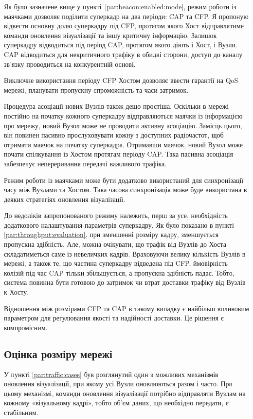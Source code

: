 \documentclass[a4paper,ukrainian,utf8,nocolumnsxix,floatsection,equationsection]{eskdtext}
\begin{document}
Як було зазначене вище у пункті~\ref{par:beacon:enabled:mode}, режим роботи із маячками дозволяє поділити суперкадр на два періоди: CAP та CFP. Я пропоную відвести основну долю суперкадру під CFP, протягом якого Хост відправлятиме команди оновлення візуалізації та іншу критичну інформацію. Залишок суперкадру відводиться під період CAP, протягом якого діють і Хост, і Вузли. CAP відводиться для некритичного трафіку в обидві сторони, доступ до каналу зв’язку проводиться на конкурентній основі. 

Виключне використання періоду CFP Хостом дозволяє ввести гарантії на QoS мережі, планувати пропускну спроможність та часи затримок. 

Процедура асоціації нових Вузлів також дещо простіша. Оскільки в мережі постійно на початку кожного суперкадру відправляються маячки із інформацією про мережу, новий Вузол може не проводити активну асоціацію. Замісць цього, він повинен пасивно прослуховувати кожну з доступних радіочастот, щоб отримати маячок на початку суперкадра. Отримавши маячок, новий Вузол може почати спілкування із Хостом протягам періоду CAP. Така пасивна асоціація забезпечує непереривання передачі важливого трафіка.

Режим роботи із маячками може бути додатково використаний для синхронізації часу між Вузлами та Хостом. Така часова синхронізація може буде використана в деяких стратегіях оновлення візуалізації.

До недоліків запропонованого режиму належить, перш за усе, необхідність додаткового налаштування параметрів суперкадру. Як було показано в пункті \ref{par:throughput:evaluation}, при зменшенні розміру кадру, зменшується пропускна здібність. Але, можна очікувати, що трафік від Вузлів до Хоста складатиметься саме із невеличких кадрів. Враховуючи велику кількість Вузлів в мережі, а також те, що частина суперкадру відведена під CFP, ймовірність колізій під час CAP тільки збільшується, а пропускна здібність падає. Тобто, система повинна бути готовою до затримок чи втрат доставки трафіку від Вузлів к Хосту. 

Відношення між розмірами CFP та CAP в такому випадку є найбільш впливовим параметром для регулювання якості та надійності доставки. Це рішення є компромісним.

\subsection{Оцінка розміру мережі}

У пункті \ref{par:traffic:cases} був розглянутий один з можливих механізмів оновлення візуалізації, при якому усі Вузли оновлюються разом і часто. При цьому механізмі, команди оновлення візуалізації потрібно відправляти Вузлам на кожному «візуальному кадрі», тобто об’єм даних, що необхідно передати, є стабільним. 
\end{document}
